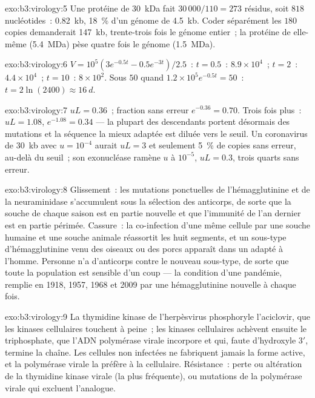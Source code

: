 \begin{solution}{exo:b3:virology:5}
Une protéine de \qty{30}{kDa} fait $30\,000/110 = 273$ résidus, soit
$818$ nucléotides~: \qty{0.82}{kb}, \qty{18}{\%} d'un génome de
\qty{4.5}{kb}. Coder séparément les $180$ copies demanderait
\qty{147}{kb}, trente-trois fois le génome entier~; la protéine de
 elle-même (\qty{5.4}{MDa}) pèse quatre fois le génome
(\qty{1.5}{MDa}).
\end{solution}

\begin{solution}{exo:b3:virology:6}
$V = 10^{5}(3e^{-0.5t} - 0.5e^{-3t})/2.5$~: $t = 0.5$~: $8.9\times
10^{4}$~; $t = 2$~: $4.4\times 10^{4}$~; $t = 10$~: $8\times 10^{2}$.
Sous $50$ quand $1.2\times 10^{5}e^{-0.5t} = 50$~: $t = 2\ln(2400) \approx
\qty{16}{d}$.
\end{solution}

\begin{solution}{exo:b3:virology:7}
$uL = 0.36$~; fraction sans erreur $e^{-0.36} = 0.70$. Trois fois plus~:
$uL =
1.08$, $e^{-1.08} = 0.34$ --- la plupart des descendants portent
désormais des mutations et la séquence la mieux adaptée est diluée vers
le seuil. Un coronavirus de \qty{30}{kb} avec $u = 10^{-4}$ aurait
$uL = 3$ et seulement \qty{5}{\%} de copies sans erreur, au-delà du
seuil~; son exonucléase ramène $u$ à $10^{-5}$, $uL = 0.3$, trois
quarts sans erreur.
\end{solution}

\begin{solution}{exo:b3:virology:8}
Glissement~: les mutations ponctuelles de l'hémagglutinine et de la
neuraminidase s'accumulent sous la sélection des anticorps, de sorte
que la souche de chaque saison est en partie nouvelle et que l'immunité
de l'an dernier est en partie périmée. Cassure~: la co-infection d'une
même cellule par une souche humaine et une souche animale réassortit
les huit segments, et un sous-type d'hémagglutinine venu des oiseaux ou
des porcs apparaît dans un  adapté à l'homme. Personne n'a
d'anticorps contre le nouveau sous-type, de sorte que toute la
population est sensible d'un coup --- la condition d'une pandémie,
remplie en 1918, 1957, 1968 et 2009 par une hémagglutinine nouvelle à
chaque fois.
\end{solution}

\begin{solution}{exo:b3:virology:9}
La thymidine kinase de l'herpèsvirus phosphoryle l'aciclovir, que les
kinases cellulaires touchent à peine~; les kinases cellulaires achèvent
ensuite le triphosphate, que l'ADN polymérase virale incorpore et qui,
faute d'hydroxyle 3$'$, termine la chaîne. Les cellules non infectées
ne fabriquent jamais la forme active, et la polymérase virale la
préfère à la cellulaire. Résistance~: perte ou altération de la
thymidine kinase virale (la plus fréquente), ou mutations de la
polymérase virale qui excluent l'analogue.
\end{solution}

